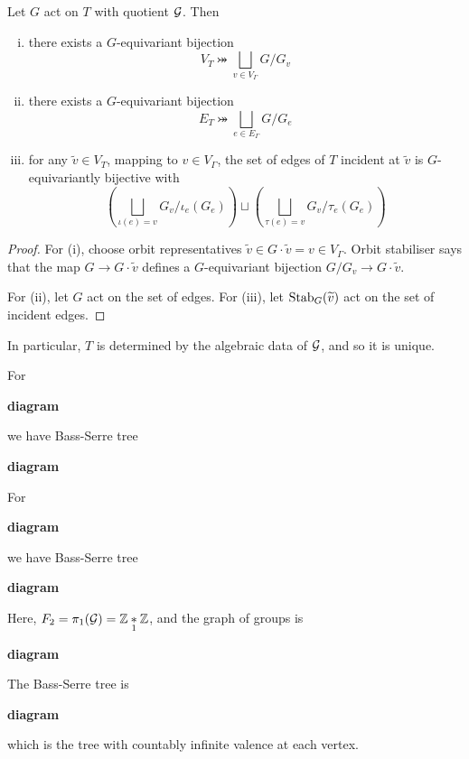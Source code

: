 \documentclass{article}
\begin{document}
\begin{proposition}
    Let \(G\) act on \(T\) with quotient \(\mathcal{G}\). Then
    \begin{enumerate}[(i)]
        \item there exists a \(G\)-equivariant bijection
        \[V_T \bij \bigsqcup_{v \in V_\Gamma}G/G_v\]
        \item there exists a \(G\)-equivariant bijection
        \[E_T \bij \bigsqcup_{e \in E_\Gamma}G/G_e\]
        \item for any \(\widetilde v \in V_T\), mapping to \(v \in V_\Gamma\), the set of edges of \(T\) incident at \(\widetilde{v}\) is \(G\)-equivariantly bijective with
        \[\left(\bigsqcup_{\iota(e) = v} G_v/\iota_e(G_e)\right) \sqcup \left(\bigsqcup_{\tau(e) = v} G_v/\tau_e(G_e)\right)\]
    \end{enumerate}
\end{proposition}

\begin{proof}
    For (i), choose orbit representatives \(\widetilde v \in G\cdot\widetilde v = v \in V_\Gamma\). Orbit stabiliser says that the map \(G \to G \cdot \widetilde v\) defines a \(G\)-equivariant bijection \(G/G_v \to G\cdot\widetilde v\).

    For (ii), let \(G\) act on the set of edges. For (iii), let \(\operatorname{Stab}_G(\widetilde v)\) act on the set of incident edges.
\end{proof}

\begin{remark}
    In particular, \(T\) is determined by the algebraic data of \(\mathcal{G}\), and so it is unique.
\end{remark}

\begin{example}
    For

    \textbf{diagram}

    we have Bass-Serre tree

    \textbf{diagram}
\end{example}

\begin{example}
    For

    \textbf{diagram}

    we have Bass-Serre tree

    \textbf{diagram}
\end{example}

\begin{example}
    Here, \(F_2 = \pi_1(\mathcal{G}) = \mathbb{Z} \underset1* {\mathbb{Z}}\), and the graph of groups is

    \textbf{diagram}

    The Bass-Serre tree is

    \textbf{diagram}

    which is the tree with countably infinite valence at each vertex.
\end{example}
\end{document}
